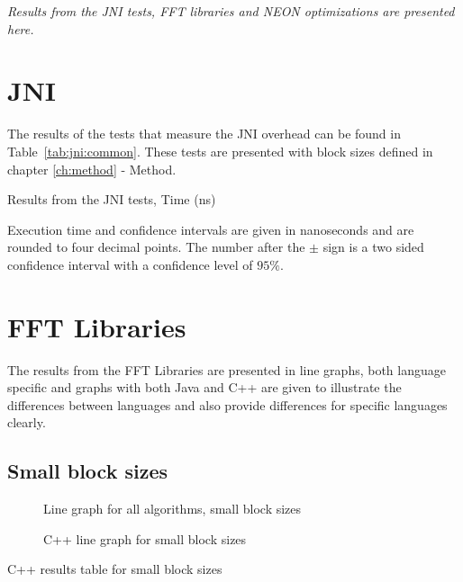 \textit{Results from the JNI tests, FFT libraries and NEON optimizations are presented here.}

\section{JNI}
The results of the tests that measure the JNI overhead can be found in Table~\ref{tab:jni:common}. These tests are presented with block sizes defined in chapter \ref{ch:method} - Method.

\begin{table}[H]
    \centering
    \label{tab:jni:common}
    \caption{Results from the JNI tests, Time (ns)}
    
\end{table}

Execution time and confidence intervals are given in nanoseconds and are rounded to four decimal points. The number after the $\pm$ sign is a two sided confidence interval with a confidence level of $95\%$.



\section{FFT Libraries}
The results from the FFT Libraries are presented in line graphs, both language specific and graphs with both Java and C++ are given to illustrate the differences between languages and also provide differences for specific languages clearly.

\subsection{Small block sizes}

\begin{figure}
    \centering
    \caption{Line graph for all algorithms, small block sizes}
    \label{fig:all:line:small}
    
\end{figure}

\begin{figure}
    \centering
    \label{fig:cpp:line:small}
    \caption{C++ line graph for small block sizes}
    
\end{figure}
\begin{table}
    \centering
    \label{tab:cpp:small}
    \caption{C++ results table for small block sizes}
    \resizebox{\columnwidth}{!}{
        
    }
\end{table}


